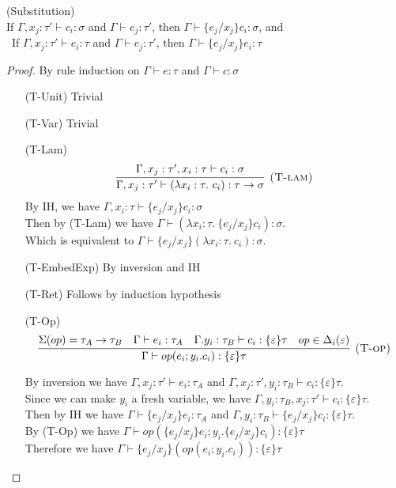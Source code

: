 \begin{lemma} (Substitution) \\
If $\Gamma, x_j : \tau' \vdash c_i : \sigma$ and $\Gamma \vdash e_j : \tau'$, then $\Gamma \vdash \{e_j/x_j\}c_i : \sigma$, and\\\
If $\Gamma, x_j : \tau' \vdash e_i : \tau $ and $\Gamma \vdash e_j : \tau'$, then $\Gamma \vdash \{e_j/x_j\}e_i : \tau$

\begin{proof}
By rule induction on $\Gamma \vdash e : \tau$ and $\Gamma \vdash c : \sigma$
\begin{enumerate}[align=left]
\item[(T-Unit)] Trivial
\item[(T-Var)] Trivial
\item[(T-Lam)] 
$$
\infer[\textsc{(T-lam)}]
  {\Gamma, x_j : \tau'  \vdash (\lambda x_i: \tau.\ c_i) : \tau \rightarrow \sigma}
  {\Gamma,x_j : \tau',  x_i:\tau \vdash c_i : \sigma} 
$$
By IH, we have $\Gamma, x_i:\tau \vdash \{e_j/x_j\}c_i : \sigma$\\
Then by (T-Lam) we have $\Gamma \vdash (\lambda x_i : \tau.\ \{e_j/x_j\}c_i) : \sigma$.\\
Which is equivalent to $\Gamma \vdash \{e_j/x_j\}(\lambda x_i : \tau.\ c_i) : \sigma$.
\item[(T-EmbedExp)] By inversion and IH
\item[(T-Ret)] Follows by induction hypothesis
\item[(T-Op)]  
$$
\infer[\textsc{(T-op)}]
  {\Gamma\vdash op(e_i; y_i.c_i) : \{\varepsilon\}\tau }
  {\Sigma(op) = \tau_A \rightarrow \tau_B & \Gamma \vdash e_i : \tau_A & \Gamma. y_i:\tau_B\vdash c_i: \{\varepsilon\}\tau & op \in \Delta_i(\varepsilon)} 
$$

By inversion we have $\Gamma, x_j : \tau' \vdash e_i : \tau_A$ and $\Gamma, x_j : \tau', y_i : \tau_B \vdash c_i : \{\varepsilon\} \tau$. \\
Since we can make $y_i$ a fresh variable, we have $\Gamma,  y_i : \tau_B, x_j:\tau' \vdash c_i : \{\varepsilon\} \tau$.\\
Then by IH we have $\Gamma \vdash \{e_j/x_j\}e_i : \tau_A$ and $\Gamma,  y_i : \tau_B \vdash \{e_j/x_j\}c_i : \{\varepsilon\} \tau$.\\
By (T-Op) we have $\Gamma \vdash op(\{e_j/x_j\}e_i; y_i.\{e_j/x_j\}c_i) : \{\varepsilon\}\tau$\\
Therefore we have $\Gamma \vdash \{e_j/x_j\}(op(e_i; y_i.c_i)) : \{\varepsilon\}\tau$


\end{enumerate}
\end{proof}
\end{lemma}
